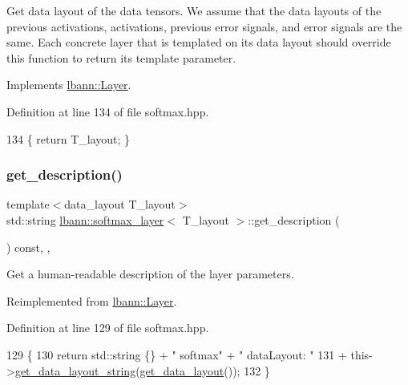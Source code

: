 Get data layout of the data tensors. We assume that the data layouts of the previous activations, activations, previous error signals, and error signals are the same. Each concrete layer that is templated on its data layout should override this function to return its template parameter. 

Implements \hyperlink{classlbann_1_1Layer_a5dfb66e81fc085997402a5e2241316bd}{lbann\+::\+Layer}.



Definition at line 134 of file softmax.\+hpp.


\begin{DoxyCode}
134 \{ \textcolor{keywordflow}{return} T\_layout; \}
\end{DoxyCode}
\mbox{\label{classlbann_1_1softmax__layer_afc8ecde99bde8cbacae5dc1779052d1d}} 
\subsubsection{\texorpdfstring{get\+\_\+description()}{get\_description()}}
{\footnotesize\ttfamily template$<$data\+\_\+layout T\+\_\+layout$>$ \\
std\+::string \hyperlink{classlbann_1_1softmax__layer}{lbann\+::softmax\+\_\+layer}$<$ T\+\_\+layout $>$\+::get\+\_\+description (\begin{DoxyParamCaption}{ }\end{DoxyParamCaption}) const\hspace{0.3cm}{\ttfamily [inline]}, {\ttfamily [override]}, {\ttfamily [virtual]}}

Get a human-\/readable description of the layer parameters. 

Reimplemented from \hyperlink{classlbann_1_1Layer_acc0803d3428914ca1eb5988c4309174a}{lbann\+::\+Layer}.



Definition at line 129 of file softmax.\+hpp.


\begin{DoxyCode}
129                                              \{
130     \textcolor{keywordflow}{return} std::string \{\} + \textcolor{stringliteral}{" softmax"} + \textcolor{stringliteral}{" dataLayout: "}
131            + this->\hyperlink{classlbann_1_1Layer_ae3f4a5602df821f4221614b1e3782dc1}{get\_data\_layout\_string}(\hyperlink{classlbann_1_1softmax__layer_af45bc0942bf38d6de7c28032d9bb0e73}{get\_data\_layout}());
132   \}
\end{DoxyCode}
\mbox{\label{classlbann_1_1softmax__layer_a344145869f2f28f91d9de1fec74075e5}} 

